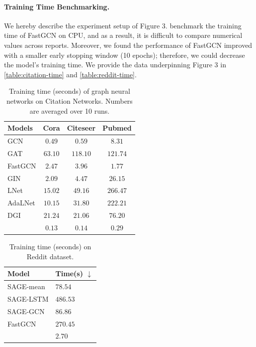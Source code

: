 \paragraph{Training Time Benchmarking.} We hereby describe the experiment setup of Figure 3.
\citet{FastGCN} benchmark the training time of FastGCN on CPU, and as a result, it is difficult to compare numerical values across reports.
Moreover, we found the performance of FastGCN improved with a smaller early stopping window (10 epochs); therefore, we could decrease the model's training time.
We provide the data underpinning Figure 3 in \autoref{table:citation-time} and \autoref{table:reddit-time}.
%
\begin{table}[htb!]
\centering
        \small
        \caption{Training time (seconds) of graph neural networks on Citation Networks. Numbers are averaged over 10 runs.}
        \label{table:citation-time}
        \begin{tabular}{l|c|c|c}
        \toprule
        Models & Cora & Citeseer & Pubmed \\ 
        \midrule
        GCN & $0.49$ & $0.59$ & $8.31$ \\
        GAT & $63.10$ & $118.10$ &  $121.74$ \\
        FastGCN & $2.47$ & $3.96 $ & $1.77$ \\
        GIN & $2.09$ &  $4.47$ & $26.15$ \\
        LNet & $15.02$ & $49.16$  & $266.47$ \\
        AdaLNet & $10.15$ & $31.80$ & $222.21$ \\
        DGI & $21.24$ & $21.06$ & $76.20$\\
        {\color{modelblue} \method{}} & $0.13$ & $0.14$ & $0.29$ \\
         \bottomrule
        \end{tabular}
\end{table}
%
\begin{table}[htb!]
        \centering
        \small
        \caption{Training time (seconds) on Reddit dataset.}
        \label{table:reddit-time}
        \begin{tabular}{l|l}
        \toprule
        Model & Time(s) $\downarrow$ \\
         \midrule
        SAGE-mean & $78.54$\\
        SAGE-LSTM & $486.53$\\
        SAGE-GCN & $86.86$\\
        FastGCN & $270.45$\\
        {\color{modelblue} \method{}} & $2.70$ \\
        \bottomrule
        \end{tabular}
\end{table}
